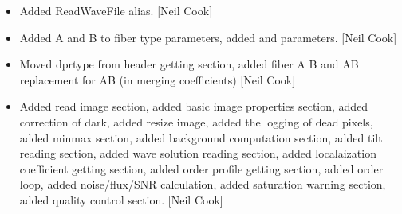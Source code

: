 \documentclass[a4paper,10pt,english]{report}
\begin{document}
\begin{itemize}
\item {} 
Added ReadWaveFile alias. {[}Neil Cook{]}

\item {} 
Added A and B to fiber type parameters, added  and 
parameters. {[}Neil Cook{]}

\item {} 
Moved dprtype from header getting section, added fiber A B and AB
replacement for AB (in merging coefficients) {[}Neil Cook{]}

\item {} 
Added read image section, added basic image properties section, added
correction of dark, added resize image, added the logging of dead
pixels, added minmax  section, added background computation
section, added tilt reading section, added wave solution reading
section, added localaization coefficient getting section, added order
profile getting section, added order loop, added noise/flux/SNR
calculation, added saturation warning section, added quality control
section. {[}Neil Cook{]}

\end{itemize}
\end{document}
